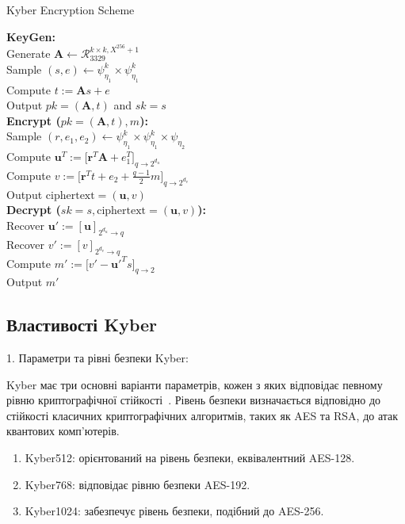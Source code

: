 \begin{algorithm}[H]
	\caption{Kyber Encryption Scheme}
	
	\textbf{KeyGen:}\\
		 Generate $\mathbf{A} \leftarrow \mathcal{R}_{3329}^{k \times k, X^{256}+1}$\\
		 Sample $(s, e) \leftarrow \psi_{\eta_1}^k \times \psi_{\eta_1}^k$\\
		Compute $t := \mathbf{A}s + e$\\
		Output $pk = (\mathbf{A}, t)$ and $sk = s$\\
	
	\textbf{Encrypt ($pk = (\mathbf{A}, t), m$):}\\
		Sample $(r, e_1, e_2) \leftarrow \psi_{\eta_1}^k \times \psi_{\eta_1}^k \times \psi_{\eta_2}$\\
		 Compute $\mathbf{u}^T := \big[\mathbf{r}^T \mathbf{A} + e_1^T \big]_{q \to 2^{d_u}}$\\
		Compute $v := \big[\mathbf{r}^T t + e_2 + \frac{q-1}{2} m \big]_{q \to 2^{d_v}}$\\
		Output $\text{ciphertext} = (\mathbf{u}, v)$\\
	
	\textbf{Decrypt ($sk = s, \text{ciphertext} = (\mathbf{u}, v)$):}\\
		Recover $\mathbf{u}' := [\mathbf{u}]_{2^{d_u} \to q}$\\
		 Recover $v' := [v]_{2^{d_v} \to q}$\\
		 Compute $m' := \big[v' - \mathbf{u}'^T s \big]_{q \to 2}$\\
		Output $m'$\\
	
\end{algorithm}



\subsection*{Властивості Kyber}

1. Параметри та рівні безпеки Kyber:

Kyber має три основні варіанти параметрів, кожен з яких відповідає певному рівню криптографічної стійкості~\cite{babyKyber}. Рівень безпеки визначається відповідно до стійкості класичних криптографічних алгоритмів, таких як AES та RSA, до атак квантових комп'ютерів.
\begin{enumerate}
    \item Kyber512: орієнтований на рівень безпеки, еквівалентний AES-128.
    \item Kyber768: відповідає рівню безпеки AES-192.
    \item Kyber1024: забезпечує рівень безпеки, подібний до AES-256.
\end{enumerate}

